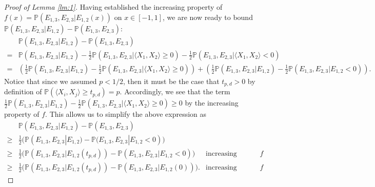 \documentclass{article}
\begin{document}
\begin{proof}[Proof of Lemma \ref{lm:1}]
Having established the increasing property of $f(x) = \mathbb{P}(E_{1,3}, E_{2,3} | E_{1, 2}(x))$ on $x \in [-1, 1]$, we are now ready to bound $\mathbb{P}(E_{1,3}, E_{2,3} | E_{1,2}) - \mathbb{P}(E_{1,3},E_{2,3})$:
\begin{align*}
    &\mathbb{P}(E_{1,3}, E_{2,3} | E_{1,2}) - \mathbb{P}(E_{1,3},E_{2,3})\\
    =& \mathbb{P}(E_{1,3}, E_{2,3} | E_{1,2}) - \frac{1}{2}\mathbb{P}(E_{1, 3}, E_{2,3}| \langle X_1, X_2 \rangle \geq 0) - \frac{1}{2}\mathbb{P}(E_{1, 3}, E_{2,3}| \langle X_1, X_2 \rangle < 0)\\
    =& \left( \frac{1}{2}\mathbb{P}(E_{1,3}, E_{2,3} | E_{1,2}) - \frac{1}{2}\mathbb{P}(E_{1, 3}, E_{2,3}| \langle X_1, X_2 \rangle \geq 0) \right) + \left( \frac{1}{2}\mathbb{P}(E_{1,3}, E_{2,3} | E_{1,2})  - \frac{1}{2}\mathbb{P}(E_{1, 3}, E_{2,3}| E_{1,2} < 0) \right).
\end{align*}
Notice that since we assumed $p < 1/2$, then it must be the case that $t_{p,d} > 0$ by definition of $\mathbb{P}(\langle X_i, X_j \rangle \geq t_{p,d}) = p$. Accordingly, we see that the term $\frac{1}{2}\mathbb{P}(E_{1,3}, E_{2,3} | E_{1,2}) - \frac{1}{2}\mathbb{P}(E_{1, 3}, E_{2,3}| \langle X_1, X_2 \rangle \geq 0) \geq 0$ by the increasing property of $f$. This allows us to simplify the above expression as
\begin{align}
    &\mathbb{P}(E_{1,3}, E_{2,3} | E_{1,2}) - \mathbb{P}(E_{1,3},E_{2,3}) \nonumber\\
    \geq& \frac{1}{2}\bigg(\mathbb{P} \left(E_{1,3}, E_{2,3} | E_{1,2})  - \mathbb{P}(E_{1, 3}, E_{2,3}| E_{1,2} < 0 \right) \bigg)\nonumber\\
    \geq& \frac{1}{2}\bigg(\mathbb{P} \left(E_{1,3}, E_{2,3} | E_{1,2}(t_{p,d}) \right)  - \mathbb{P}\left(E_{1, 3}, E_{2,3}| E_{1,2} < 0 \right) \bigg) & \text{increasing property of $f$}\nonumber\\
    \geq& \frac{1}{2} \bigg( \mathbb{P} \left(E_{1,3}, E_{2,3} | E_{1, 2}(t_{p,d})\right) - \mathbb{P} \left(E_{1,3}, E_{2,3} | E_{1, 2}(0)\right) \bigg)\label{eq4}. & \text{increasing property of $f$}
\end{align}


\end{proof}
\end{document}
